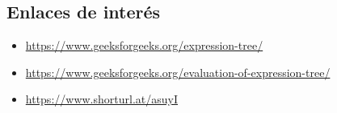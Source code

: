\documentclass[11pt]{article}
\begin{document}
\subsection{Enlaces de inter\'es}
\begin{itemize}
    \item \href{https://www.geeksforgeeks.org/expression-tree/}{https://www.geeksforgeeks.org/expression-tree/}
    \item \href{https://www.geeksforgeeks.org/evaluation-of-expression-tree/}{https://www.geeksforgeeks.org/evaluation-of-expression-tree/}
    \item \href{https://www.shorturl.at/asuyI}{https://www.shorturl.at/asuyI}
\end{itemize}
\end{document}
